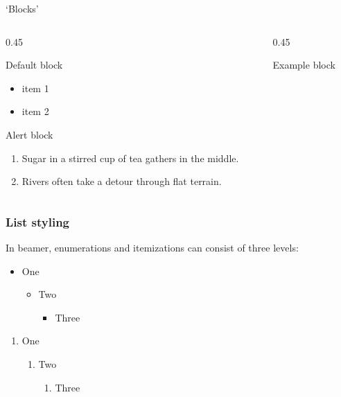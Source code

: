 \documentclass[t, aspectratio=169, english, table]{_style/tudelft-beamer}
\begin{document}
\begin{frame}{`Blocks'}
  \begin{columns}[onlytextwidth]
    \begin{column}{0.45\textwidth}
      \begin{block}{Default block}
        \begin{itemize}
          \item item 1
          \item item 2
        \end{itemize}
      \end{block}
      \begin{alertblock}{Alert block}
        \begin{enumerate}
          \item Sugar in a stirred cup of tea gathers in the middle.
          \item Rivers often take a detour through flat terrain.
        \end{enumerate}
      \end{alertblock}
    \end{column}
    \begin{column}{0.45\textwidth}
      \begin{exampleblock}{Example block}
        \center
        
      \end{exampleblock}
    \end{column}
  \end{columns}
\end{frame}


\begin{frame}
  \minipage[t]{\linewidth}
  \frametitle{List styling}
  In beamer, enumerations and itemizations can consist of three levels:
  \begin{itemize}
    \item One
    \begin{itemize}
    \item Two
    \begin{itemize}
      \item Three
    \end{itemize}
    \end{itemize}
  \end{itemize}
  \begin{enumerate}
    \item One
    \begin{enumerate}
    \item Two
    \begin{enumerate}
      \item Three
    \end{enumerate}
    \end{enumerate}
  \end{enumerate}
  \endminipage
\end{frame}
\end{document}
